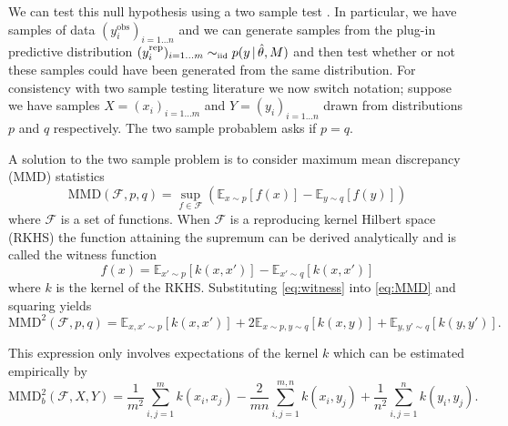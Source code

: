 \documentclass{article} %
\begin{document}
We can test this null hypothesis using a two sample test \citep[e.g.][]{Hotelling1951-jd, Bickel1969-ao}.
In particular, we have samples of data $(y_i^\textrm{obs})_{i=1\ldots n}$ and we can generate samples from the plug-in predictive distribution ${(y_i^\textrm{rep})_{i=1\ldots m} \simiid p(y \given \hat\theta, M)}$ and then test whether or not these samples could have been generated from the same distribution.
For consistency with two sample testing literature we now switch notation; suppose we have samples ${X = (x_i)_{i=1\ldots m}}$ and ${Y = (y_i)_{i=1\ldots n}}$ drawn \iid from distributions $p$ and $q$ respectively.
The two sample probablem asks if $p = q$.

A solution to the two sample problem is to consider maximum mean discrepancy (MMD) \citep[e.g.][]{Gretton2008-ik} statistics
\begin{equation}
\textrm{MMD}(\mathcal{F},p,q) = \sup_{f \in \mathcal{F}}(\mathbb{E}_{x\sim p}[f(x)] - \mathbb{E}_{y\sim q}[f(y)])
\label{eq:MMD}
\end{equation}
where $\mathcal{F}$ is a set of functions.
When $\mathcal{F}$ is a reproducing kernel Hilbert space (RKHS) the function attaining the supremum can be derived analytically and is called the witness function
\begin{equation}
f(x) = \mathbb{E}_{x'\sim p}[k(x,x')] - \mathbb{E}_{x'\sim q}[k(x,x')]
\label{eq:witness}
\end{equation}
where $k$ is the kernel of the RKHS.
Substituting \eqref{eq:witness} into \eqref{eq:MMD} and squaring yields
\vspace{-0.0\baselineskip}
\begin{equation}
  \textrm{MMD}^2(\mathcal{F},p,q) = \mathbb{E}_{x,x'\sim p}[k(x,x')] + 2\mathbb{E}_{x\sim p,y\sim q}[k(x,y)] + \mathbb{E}_{y,y'\sim q}[k(y,y')].
\end{equation}

\vspace{-0.5\baselineskip}

This expression only involves expectations of the kernel $k$ which can be estimated empirically by
\vspace{-0.3\baselineskip}
\begin{equation}
  \textrm{MMD}_b^2(\mathcal{F},X,Y) = \frac{1}{m^2}\sum_{i,j=1}^{m}k(x_i,x_j) - \frac{2}{mn}\sum_{i,j=1}^{m,n}k(x_i,y_j) + \frac{1}{n^2}\sum_{i,j=1}^{n}k(y_i,y_j).
\label{eq:MMD_b}
\end{equation}

\vspace{-\baselineskip}
\end{document}
